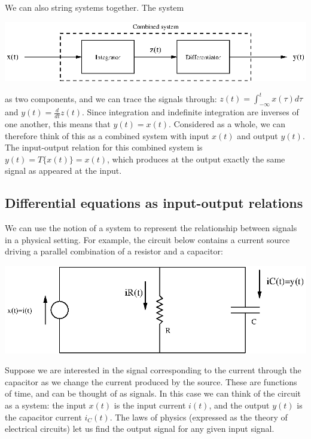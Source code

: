 \documentclass[10pt]{beamer}
\begin{document}
We can also string systems together.  The system
\begin{center}
  \includegraphics{intdiffsystem}
\end{center}
as two components, and we can trace the signals through:  $z(t) = \int_{-\infty}^t x(\tau) d\tau$ and $y(t) = \frac{d}{dt} z(t)$.  Since integration and indefinite integration are inverses of one another, this means that $y(t) = x(t)$.  Considered as a whole, we can therefore think of this as a combined system with input $x(t)$ and output $y(t)$.  The input-output relation for this combined system is $y(t) = T\{x(t)\} = x(t)$, which produces at the output exactly the same signal as appeared at the input.

\subsection{Differential equations as input-output relations}

We can use the notion of a system to represent the relationship between signals in a physical setting.  For example, the circuit below contains a current source driving a parallel combination of a resistor and a capacitor:
\begin{center}
  \includegraphics{circuitrcparallel}
\end{center}
Suppose we are interested in the signal corresponding to the current through the capacitor as we change the current produced by the source.  These are functions of time, and can be thought of as signals.  In this case we can think of the circuit as a system:  the input $x(t)$ is the input current $i(t)$, and the output $y(t)$ is the capacitor current $i_C(t)$.  The laws of physics (expressed as the theory of electrical circuits) let us find the output signal for any given input signal.
\end{document}
